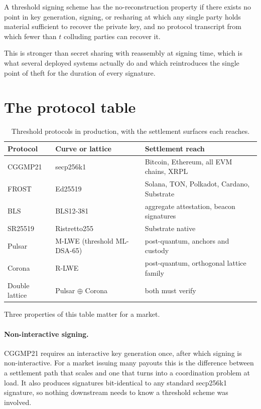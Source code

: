 \documentclass[11pt,a4paper]{article}
\begin{document}
\begin{definition}
A threshold signing scheme has the no-reconstruction property if there exists no
point in key generation, signing, or resharing at which any single party holds
material sufficient to recover the private key, and no protocol transcript from
which fewer than $t$ colluding parties can recover it.
\end{definition}

This is stronger than secret sharing with reassembly at signing time, which is
what several deployed systems actually do and which reintroduces the single
point of theft for the duration of every signature.

\section{The protocol table}

\begin{table}[h]
\centering
\begin{tabular}{lll}
\toprule
Protocol & Curve or lattice & Settlement reach \\
\midrule
CGGMP21 & secp256k1 & Bitcoin, Ethereum, all EVM chains, XRPL \\
FROST & Ed25519 & Solana, TON, Polkadot, Cardano, Substrate \\
BLS & BLS12-381 & aggregate attestation, beacon signatures \\
SR25519 & Ristretto255 & Substrate native \\
Pulsar & M-LWE (threshold ML-DSA-65) & post-quantum, anchors and custody \\
Corona & R-LWE & post-quantum, orthogonal lattice family \\
Double lattice & Pulsar $\oplus$ Corona & both must verify \\
\bottomrule
\end{tabular}
\caption{Threshold protocols in production, with the settlement surfaces each
reaches.}
\end{table}

Three properties of this table matter for a market.

\paragraph{Non-interactive signing.} CGGMP21 requires an interactive key
generation once, after which signing is non-interactive. For a market issuing
many payouts this is the difference between a settlement path that scales and
one that turns into a coordination problem at load. It also produces signatures
bit-identical to any standard secp256k1 signature, so nothing downstream needs
to know a threshold scheme was involved.
\end{document}
